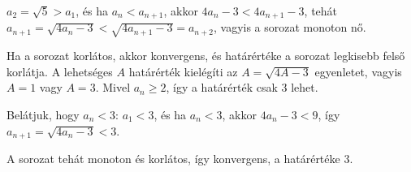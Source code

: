 \documentclass[11pt]{scrartcl}
\begin{document}
$a_2 = \sqrt{5} > a_1$, és ha $a_n < a_{n + 1}$, akkor
$4a_n - 3 < 4a_{n + 1} - 3$, tehát
\(
a_{n + 1} = \sqrt{4a_n - 3} < \sqrt{4a_{n + 1} - 3} = a_{n + 2}
\),
vagyis a sorozat monoton nő.

Ha a sorozat korlátos, akkor konvergens, és határértéke a sorozat legkisebb
felső korlátja. A lehetséges $A$ határérték kielégíti az
$A = \sqrt{4A - 3}$ egyenletet, vagyis $A = 1$ vagy $A = 3$. Mivel
$a_n \ge 2$, így a határérték csak $3$ lehet.

Belátjuk, hogy $a_n < 3$: $a_1 < 3$, és ha $a_n < 3$, akkor $4a_n - 3 < 9$,
így $a_{n + 1} = \sqrt{4a_n - 3} < 3$.

A sorozat tehát monoton és korlátos, így konvergens, a határértéke $3$.
\end{document}

